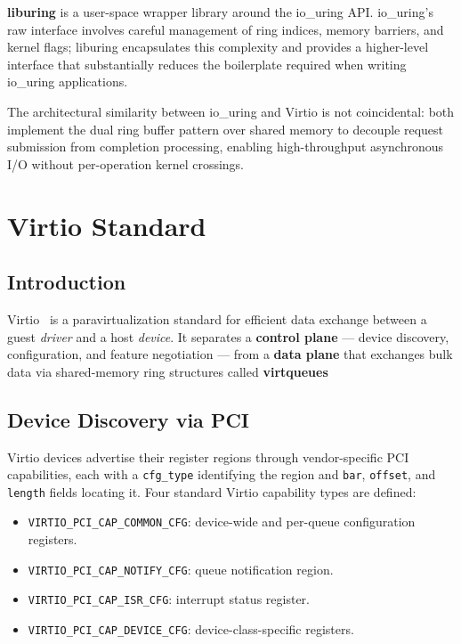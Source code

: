 \documentclass[12pt, a4paper, oneside]{report}
\begin{document}
\textbf{liburing} is a user-space wrapper library around the io\_uring API.
io\_uring's raw interface involves careful management of ring indices, memory
barriers, and kernel flags; liburing encapsulates this complexity and provides a
higher-level interface that substantially reduces the boilerplate required when
writing io\_uring applications.

The architectural similarity between io\_uring and Virtio is not coincidental:
both implement the dual ring buffer pattern over shared memory to decouple
request submission from completion processing, enabling high-throughput
asynchronous I/O without per-operation kernel crossings.

\section{Virtio Standard}
\label{sec:virtio}

\subsection{Introduction}

Virtio~\cite{virtio2024} is a paravirtualization standard for efficient data
exchange between a guest \textit{driver} and a host \textit{device}.  It
separates a \textbf{control plane} --- device discovery, configuration, and
feature negotiation --- from a \textbf{data plane} that exchanges bulk data via
shared-memory ring structures called \textbf{virtqueues}

\subsection{Device Discovery via PCI}

Virtio devices advertise their register regions through vendor-specific PCI
capabilities, each with a \texttt{cfg\_type} identifying the region and
\texttt{bar}, \texttt{offset}, and \texttt{length} fields locating it.  Four
standard Virtio capability types are defined:

\begin{itemize}
  \item \texttt{VIRTIO\_PCI\_CAP\_COMMON\_CFG}: device-wide and per-queue
        configuration registers.
  \item \texttt{VIRTIO\_PCI\_CAP\_NOTIFY\_CFG}: queue notification region.
  \item \texttt{VIRTIO\_PCI\_CAP\_ISR\_CFG}: interrupt status register.
  \item \texttt{VIRTIO\_PCI\_CAP\_DEVICE\_CFG}: device-class-specific registers.
\end{itemize}
\end{document}
